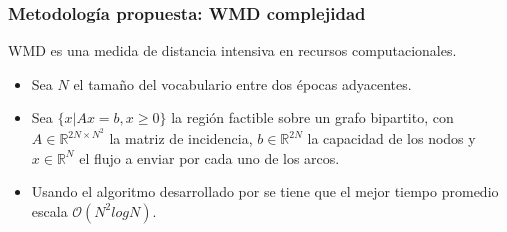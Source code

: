 \documentclass[
	spanish, %
	aspectratio=43, %
	hyperref={pdfencoding=auto,psdextra},
	xcolor={dvipsnames,table,usenames}
]{beamer}
\begin{document}
\begin{frame}
\frametitle{Metodología propuesta: WMD complejidad}


WMD es una medida de distancia intensiva en recursos computacionales.
\begin{itemize}
  \item Sea $N$ el tamaño del vocabulario entre dos épocas adyacentes.
  \item Sea $\{x| Ax=b, x\geq 0\}$ la región factible sobre un grafo bipartito, con $A\in \mathbb{R}^{2N\times N^{2}}$ la matriz de incidencia, $b\in \mathbb{R}^{2N}$ la capacidad de los nodos y $x\in \mathbb{R}^{N}$ el flujo a enviar por cada uno de los arcos.
  \item Usando el algoritmo desarrollado por \cite{pele2009fast} se tiene que el mejor tiempo promedio escala $\mathcal{O}(N^{2}log N)$.
\end{itemize}


\end{frame}
\end{document}
